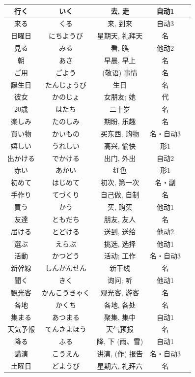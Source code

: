 \begin{longtable}{|c|c|c|c|c|}
行く & いく & 去, 走 & 自动1 &  \\ \hline
来る & くる & 来, 到来 & 自动3 &  \\ \hline
日曜日 & にちようび & 星期天, 礼拜天 & 名 &  \\ \hline
見る & みる & 看, 瞧 & 他动2 &  \\ \hline
朝 & あさ & 早晨, 早上 & 名 &  \\ \hline
ご用 & ごよう & (敬语) 事情 & 名 &  \\ \hline
誕生日 & たんじょうび & 生日 & 名 &  \\ \hline
彼女 & かのじょ & 女朋友; 她 & 代 &  \\ \hline
20歳 & はたち & 二十岁 & 名 &  \\ \hline
楽しみ & たのしみ & 期盼, 乐趣 & 名 &  \\ \hline
買い物 & かいもの & 买东西, 购物 & 名・自动3 &  \\ \hline
嬉しい & うれしい & 高兴, 愉快 & 形1 &  \\ \hline
出かける & でかける & 出门, 外出 & 自动2 &  \\ \hline
赤い & あかい & 红色 & 形1 &  \\ \hline
初めて & はじめて & 初次, 第一次 & 名・副 &  \\ \hline
手作り & てづくり & 自己做, 自制 & 名 &  \\ \hline
買う & かう & 买, 购买 & 他动1 &  \\ \hline
友達 & ともだち & 朋友, 友人 & 名 &  \\ \hline
届ける & とどける & 送到, 送给 & 他动2 &  \\ \hline
選ぶ & えらぶ & 挑选, 选择 & 他动1 &  \\ \hline
活動 & かつどう & 活动; 工作 & 名・自动3 &  \\ \hline
新幹線 & しんかんせん & 新干线 & 名 &  \\ \hline
聞く & きく & 询问; 听 & 他动1 &  \\ \hline
観光客 & かんこうきゃく & 观光客, 游客 & 名 &  \\ \hline
各地 & かくち & 各地, 各处 & 名 &  \\ \hline
集まる & あつまる & 聚集, 集中 & 自动1 &  \\ \hline
天気予報 & てんきよほう & 天气预报 & 名 &  \\ \hline
降る & ふる & 降, 下 (雨、雪) & 自动1 &  \\ \hline
講演 & こうえん & 讲演, (作) 报告 & 名・自动3 &  \\ \hline
土曜日 & どようび & 星期六, 礼拜六 & 名 &  \\ \hline

\end{longtable}
